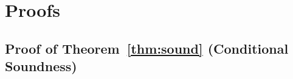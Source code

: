 \documentclass[11pt]{article}
\begin{document}
\newpage
\appendix

\section{Proofs}\label{app:proofs}

\subsection{Proof of Theorem~\ref{thm:sound} (Conditional Soundness)}
\end{document}
